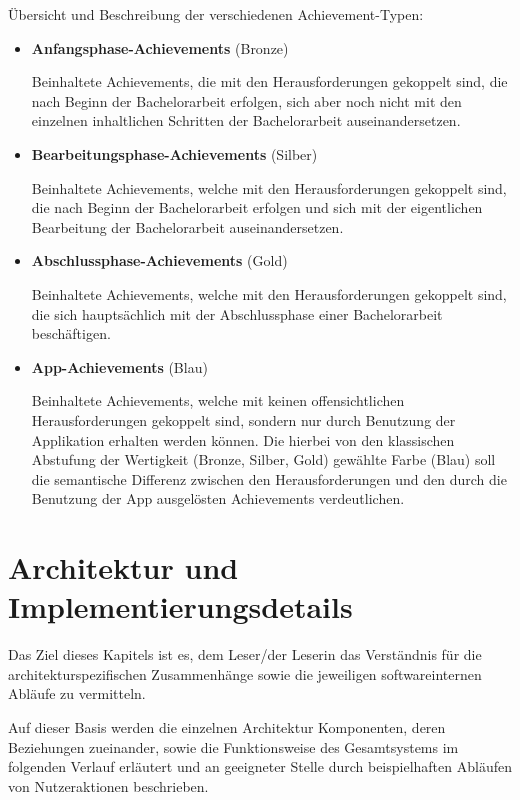 \documentclass[bibliography=totoc,listof=totoc,BCOR=5mm,DIV=12,oneside]{scrbook}
\begin{document}
\par \bigskip Übersicht und Beschreibung der verschiedenen Achievement-Typen:
\begin{itemize}
\item \textbf{Anfangsphase-Achievements} (Bronze)
\par Beinhaltete Achievements, die mit den Herausforderungen gekoppelt sind, die nach Beginn der Bachelorarbeit erfolgen, sich aber noch nicht mit den einzelnen inhaltlichen Schritten der Bachelorarbeit auseinandersetzen.
\item \textbf{Bearbeitungsphase-Achievements} (Silber)
\par Beinhaltete Achievements, welche mit den Herausforderungen gekoppelt sind, die nach Beginn der Bachelorarbeit erfolgen und sich mit der eigentlichen Bearbeitung der Bachelorarbeit auseinandersetzen.
\item \textbf{Abschlussphase-Achievements} (Gold)
\par Beinhaltete Achievements, welche mit den Herausforderungen gekoppelt sind, die sich hauptsächlich mit der Abschlussphase einer Bachelorarbeit beschäftigen.
\item \textbf{App-Achievements} (Blau)
\par Beinhaltete Achievements, welche mit keinen offensichtlichen Herausforderungen gekoppelt sind, sondern nur durch Benutzung der Applikation erhalten werden können. Die hierbei von den klassischen Abstufung der Wertigkeit (Bronze, Silber, Gold) gewählte Farbe (Blau) soll die semantische Differenz zwischen den Herausforderungen und den durch die Benutzung der App ausgelösten Achievements verdeutlichen. 
\end{itemize} 

\newpage
\chapter{Architektur und Implementierungsdetails} \label{chap:architektur}
\par Das Ziel dieses Kapitels ist es, dem Leser/der Leserin das Verständnis für die architekturspezifischen Zusammenhänge sowie die jeweiligen softwareinternen Abläufe zu vermitteln. 
\par Auf dieser Basis werden die einzelnen Architektur Komponenten, deren Beziehungen zueinander, sowie die Funktionsweise des Gesamtsystems im folgenden Verlauf erläutert und an geeigneter Stelle durch beispielhaften Abläufen von Nutzeraktionen beschrieben.
\end{document}
